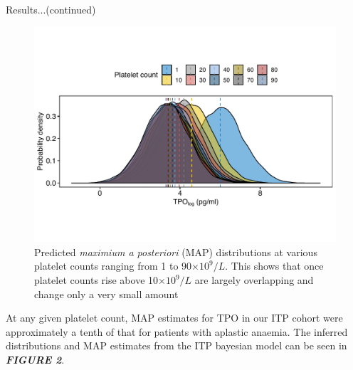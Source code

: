 \documentclass[landscape,a0paper,fontscale=0.285]{beamer} %
\newlength{\onecolwid}
\newlength{\twocolwid}
\begin{document}
\begin{frame}[t]
\begin{columns}[t]
\begin{column}{\twocolwid}
\begin{columns}[t,totalwidth=\twocolwid]
\begin{column}{\onecolwid}
\begin{block}{Results...(continued)}
\begin{figure}[H]
\includegraphics[width=0.8\linewidth]{fig/Probability_density.pdf}
\caption{Predicted \textit{maximium a posteriori} (MAP) distributions at various platelet counts ranging from 1 to 90$\times 10^9/L$. This shows that once platelet counts rise above 10$\times 10^9/L$ are largely overlapping and change only a very small amount}
\end{figure}

At any given platelet count, MAP estimates for TPO in our ITP cohort were approximately a tenth of that for patients with aplastic anaemia. The inferred distributions and MAP estimates from the ITP bayesian model can be seen in \textbf{\emph{FIGURE 2}}.









\end{block}
\end{column}
\end{columns}
\end{column}
\end{columns}
\end{frame}
\end{document}
